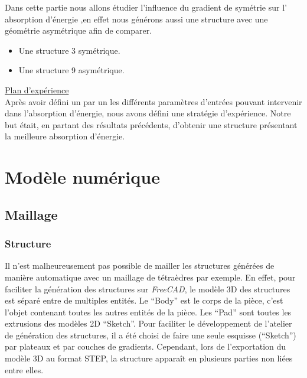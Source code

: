 \documentclass[a4paper]{article}
\begin{document}
	Dans cette partie nous allons étudier l’influence du gradient de symétrie sur l' absorption d'énergie ,en effet nous générons aussi une structure avec une géométrie asymétrique afin de comparer.
	\begin{itemize}
		\item Une structure 3 symétrique.
		\item Une structure 9 asymétrique. 
	\end{itemize}
	
	\underline{Plan d'expérience}\\
	
	Après avoir défini un par un les différents paramètres d'entrées pouvant intervenir dans l'absorption d'énergie, nous avons défini une stratégie d'expérience. Notre but était, en partant des résultats précédents, d'obtenir une structure présentant la meilleure absorption d'énergie.
	\newpage
	
	\section{Modèle numérique}
	\subsection{Maillage}
	\subsubsection{Structure}
	
	\hspace{0.5cm}Il n’est malheureusement pas possible de mailler les structures générées de manière automatique avec un maillage de tétraèdres par exemple. En effet, pour faciliter la génération des structures sur \textit{FreeCAD}, le modèle 3D des structures est séparé entre de multiples entités. Le “Body” est le corps de la pièce, c’est l’objet contenant toutes les autres entités de la pièce. Les “Pad” sont toutes les extrusions des modèles 2D “Sketch”. Pour faciliter le développement de l’atelier de génération des structures, il a été choisi de faire une seule esquisse (“Sketch”) par plateaux et par couches de gradients. Cependant, lors de l’exportation du modèle 3D au format STEP, la structure apparaît en plusieurs parties non liées entre elles.
	
\end{document}
